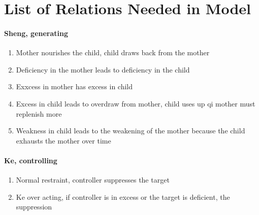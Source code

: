 \documentclass{article}
\newcommand{\ignore}[1]{}
\begin{document}
\ignore{
\begin{equation}
\begin{array}{rl}
\dot{x_1} &= (b_1 + g_1 x_5 -a_1 x_1)x_1 - k_1 x_4 \\
\dot{x_2} &= (b_2 + g_2 x_1 -a_2 x_2)x_2 - k_2 x_5 \\
\dot{x_3} &= g_3 x_2 - k_3 x_1 \\
\dot{x_4} &= g_4 x_3 - k_4 x_2 \\
\dot{x_5} &= g_5 x_4  - k_5 x_3  - c_5 (1+\frac{x_1}{h_1}) x_5
\end{array}
\end{equation}
}


\section{List of Relations Needed in Model}

\paragraph{Sheng, generating}
\begin{enumerate}
    \item Mother nourishes the child, child draws back from the mother
    \item Deficiency in the mother leads to deficiency in the child
    \item Exxcess in mother has excess in child
    \item Excess in child leads to overdraw from mother, child uses up qi mother must replenish more
    \item Weakness in child leads to the weakening of the mother because the child exhausts the mother over time
\end{enumerate}

\paragraph{Ke, controlling}
\begin{enumerate}
    \item Normal restraint, controller suppresses the target
    \item Ke over acting, if controller is in excess or the target is deficient, the suppression
\end{enumerate}
\end{document}
